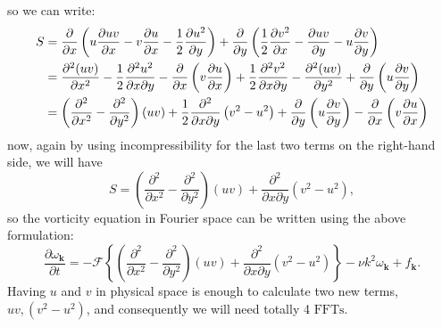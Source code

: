 \documentclass[12pt]{article}
\def\vk{\bm{k}}
\begin{document}
so we can write:
\begin{align}\label{Eq-20}
S &= \dfrac{\partial}{\partial x} \left(u\dfrac{\partial uv}{\partial x}-v\dfrac{\partial u}{\partial x}-\dfrac{1}{2}\dfrac{\partial u^2}{\partial y}\right)+\dfrac{\partial}{\partial y} \left(\dfrac{1}{2}\dfrac{\partial v^2}{\partial x}- \dfrac{\partial uv}{\partial y}-u\dfrac{\partial v}{\partial y}\right) \notag \\
&= \dfrac{\partial^2 (uv)}{\partial x^2}-\dfrac{1}{2}\dfrac{\partial^2 u^2}{\partial x \partial y}-\dfrac{\partial }{\partial x}\left(v\dfrac{\partial u}{\partial x}\right)+\dfrac{1}{2}\dfrac{\partial^2 v^2}{\partial x \partial y}-\dfrac{\partial^2 (uv)}{\partial y^2}+\dfrac{\partial }{\partial y}\left(u\dfrac{\partial v}{\partial y}\right) \\
&= \left(\dfrac{\partial^2}{\partial x^2}-\dfrac{\partial^2}{\partial y^2}\right)(uv)+\dfrac{1}{2}\dfrac{\partial^2}{\partial x \partial y}\left(v^2 - u^2 \right)+\dfrac{\partial }{\partial y}\left(u\dfrac{\partial v}{\partial y}\right)-\dfrac{\partial }{\partial x}\left(v\dfrac{\partial u}{\partial x}\right) \notag
\end{align}
now, again by using incompressibility for the last two terms on the right-hand side, we will have
\begin{equation}\label{Eq-21}
S =\left(\dfrac{\partial^2}{\partial x^2}-\dfrac{\partial^2}{\partial y^2}\right)(uv)+\dfrac{\partial^2}{\partial x \partial y}\left(v^2 - u^2 \right),
\end{equation}
so the vorticity equation in Fourier space can be written using the above formulation:
\begin{equation}\label{Eq-22}
\frac{\partial\omega_{\vk}}{\partial t} =- \mathcal{F}\left\lbrace\left(\dfrac{\partial^2}{\partial x^2}-\dfrac{\partial^2}{\partial y^2}\right)(uv)+\dfrac{\partial^2}{\partial x \partial y}\left(v^2 - u^2 \right)\right\rbrace-\nu{k}^2\omega_{\vk} + f_{\vk}.
\end{equation}
Having $u$ and $v$ in physical space is enough to calculate two new terms, $uv, (v^2 - u^2)$, and consequently we will need totally 4 $\text{FFTs}$.

\clearpage
{}
{}


\clearpage
{}
{}
\printindex
\end{document}
